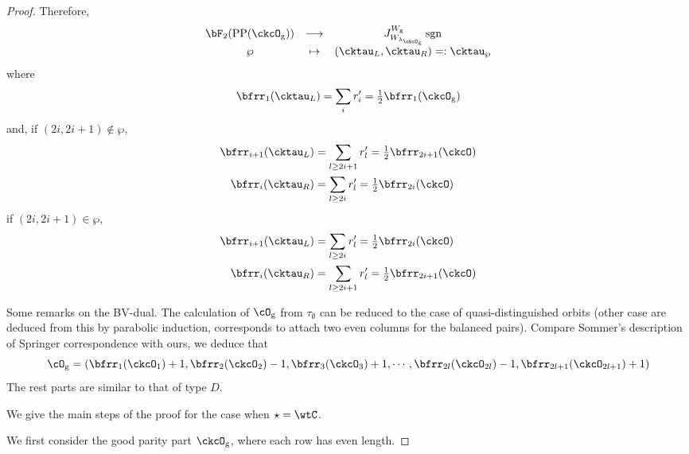 \documentclass[12pt,a4paper]{amsart}
\newcommand{\sgn}{\operatorname{sgn}}
\numberwithin{equation}{section}
\theoremstyle{remark}
\def\half{{\tfrac{1}{2}}}
\def\lamckg{\lambda_{\ckcO_{\mathrm g}}}
\def\CPP{\mathrm{PP}}
\begin{document}
\begin{proof}
{{      Therefore,
      \[
        \begin{array}{ccc}
          \bF_{2}(\CPP(\ckcO_{\mathrm g}))&\longrightarrow
          & J_{W_{\lamckg}}^{W_{\mathrm g}} \sgn \\
          \wp&\mapsto&    (\cktau_{L},\cktau_{R}) =:\cktau_{\wp}
        \end{array}
      \]
      where
      \[
        \bfrr_{1}(\cktau_{L}) = \sum_{i} r'_{i} = \half \bfrr_{1}(\ckcO_{\mathrm g})
      \]
      and, if $(2i,2i+1)\notin \wp$,
      \[
        \begin{split}
          \bfrr_{i+1}(\cktau_{L}) & = \sum_{l\geq 2i+1} r'_{l}
          = \half\bfrr_{2i+1}(\ckcO)\\
          \bfrr_{i}(\cktau_{R}) & = \sum_{l\geq 2i} r'_{l} = \half\bfrr_{2i}(\ckcO)
        \end{split}
      \]
      if $(2i,2i+1)\in \wp$,
      \[
        \begin{split}
          \bfrr_{i+1}(\cktau_{L}) & = \sum_{l\geq 2i} r'_{l}
          = \half\bfrr_{2i}(\ckcO)\\
          \bfrr_{i}(\cktau_{R}) & = \sum_{l\geq 2i+1} r'_{l} = \half\bfrr_{2i+1}(\ckcO)
        \end{split}
      \]

      Some remarks on the BV-dual. The calculation of $\cO_{\mathrm g}$ from
      $\tau_{\emptyset}$ can be reduced to the case of quasi-distinguished
      orbits (other case are deduced from this by parabolic induction,
      corresponds to attach two even columns for the balanced pairs). Compare
      Sommer's description of Springer correspondence with ours, we deduce that
      \[
        \cO_{\mathrm g} = (\bfrr_{1}(\ckcO_{1})+1,\bfrr_{2}(\ckcO_{2})-1,\bfrr_{3}(\ckcO_{3})+1, \cdots, \bfrr_{2l}(\ckcO_{2l})-1,\bfrr_{2l+1}(\ckcO_{2l+1})+1)
      \]
      The rest parts are similar to that of type $D$.
    }


    We give the main steps of the proof for the case when $\star = \wtC$.


    We first consider the good parity part $\ckcO_{\mathrm g}$, where each row has
    even length.

}
\end{proof}
\end{document}
